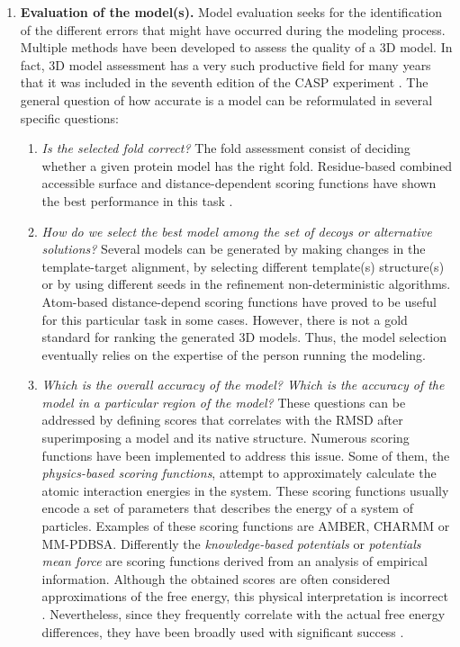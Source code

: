 \documentclass[12pt, a4paper,twoside]{tesi_upf}
\begin{document}
\begin{enumerate}
\item \textbf{Evaluation of the model(s).} Model evaluation seeks for the identification of the different errors that might have occurred during the modeling process. Multiple methods have been developed to assess the quality of a 3D model. In fact, 3D model assessment has a very such productive field for many years that it was included in the seventh edition of the CASP experiment \cite{PROT21669}. The general question of how accurate is a model can be reformulated in several specific questions: 



\begin{enumerate}[label=\roman*]
\item \textit{Is the selected fold correct?} The fold assessment consist of deciding whether a given protein model has the right fold. Residue-based combined accessible surface and distance-dependent scoring functions have shown the best performance in this task \cite{Melo2002}. 
\item \textit{How do we select the best model among the set of decoys or alternative solutions?} Several models can be generated by making changes in the template-target alignment, by selecting different template(s) structure(s) or by using different seeds in the refinement non-deterministic algorithms. Atom-based distance-depend scoring functions have proved to be useful for this particular task in some cases\cite{Samudrala1998}. However, there is not a gold standard for ranking the generated 3D models. Thus, the model selection eventually relies on the expertise of the person running the modeling. 
\item \textit{Which is the overall accuracy of the model? Which is the accuracy of the model in a particular region of the model?} These questions can be addressed by defining scores that correlates with the RMSD after superimposing a model and its native structure. Numerous scoring functions have been implemented to address this issue. Some of them, the \textit{physics-based scoring functions}, attempt  to  approximately  calculate the  atomic  interaction  energies  in  the  system.  These scoring functions usually encode a set of parameters that describes the energy of a system of particles. Examples of these scoring functions are AMBER\cite{CASE2005}, CHARMM\cite{Brooks1983} or MM-PDBSA\cite{Fogolari2003}. Differently the \textit{knowledge-based potentials} or \textit{potentials mean force} are scoring functions derived from an analysis of empirical information. Although the obtained scores are often considered approximations of the free energy, this physical interpretation is incorrect \cite{Thomas1996}. Nevertheless, since they frequently correlate with the actual free energy differences, they have been broadly used with significant success \cite{Shen2006, Zhou2002, Sippl1995}. 
\end{enumerate}
\end{enumerate}
\end{document}
